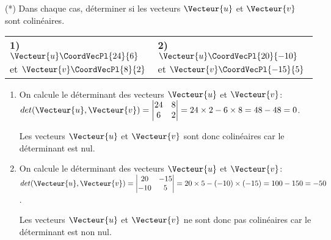 \documentclass[a4paper]{article}
\begin{document}
\begin{exercice}{(*)}{}
Dans chaque cas, déterminer si les vecteurs $\Vecteur{u}$ et $\Vecteur{v}$ sont colinéaires.
\begin{center}
  \begin{tabularx}{.95\linewidth}{X X}
  \textbf{1)}  $\Vecteur{u}\CoordVecPl{24}{6}$ et $\Vecteur{v}\CoordVecPl{8}{2}$ & \textbf{2)} $\Vecteur{u}\CoordVecPl{20}{-10}$ et $\Vecteur{v}\CoordVecPl{-15}{5}$\\
  \end{tabularx}
\end{center}

\begin{enumerate}
  \item On calcule le déterminant des vecteurs $\Vecteur{u}$ et $\Vecteur{v}$: $det(\Vecteur{u}, \Vecteur{v})=\begin{vmatrix}
    24 & 8\\
    6 & 2
  \end{vmatrix}=24\times 2-6\times 8=48-48=0$.
  
  Les vecteurs $\Vecteur{u}$ et $\Vecteur{v}$ sont donc colinéaires car le déterminant est nul.

  \item On calcule le déterminant des vecteurs $\Vecteur{u}$ et $\Vecteur{v}$: $det(\Vecteur{u}, \Vecteur{v})=\begin{vmatrix}
    20 & -15\\
    -10 & 5 
  \end{vmatrix}=20\times 5-(-10)\times(-15)=100-150=-50$.

  Les vecteurs $\Vecteur{u}$ et $\Vecteur{v}$ ne sont donc pas colinéaires car le déterminant est non nul.

\end{enumerate}
\end{exercice}
\end{document}
